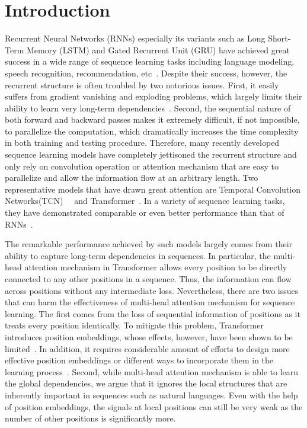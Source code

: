 \documentclass{article} \usepackage{iclr2019_conference,times}
\begin{document}
\section{Introduction}
Recurrent Neural Networks (RNNs) especially its variants such as Long Short-Term Memory (LSTM) and Gated Recurrent Unit (GRU) have achieved great success in a wide range of sequence learning tasks including language modeling, speech recognition, recommendation, etc~\citep{mikolov2010recurrent,sundermeyer2012lstm,graves2014towards,hinton2012deep,hidasi2015session}. Despite their success, however, the recurrent structure is often troubled by two notorious issues.  First, it easily suffers from gradient vanishing and exploding problems, which largely limits their ability to learn very long-term dependencies~\citep{pascanu2013difficulty}. Second, the sequential nature of both forward and backward passes makes it extremely difficult, if not impossible, to parallelize the computation, which dramatically increases the time complexity in both training and testing procedure. Therefore, many recently developed sequence learning models have completely jettisoned the recurrent structure and only rely on convolution operation or attention mechanism that are easy to parallelize and allow the information flow at an arbitrary length. Two representative models that have drawn great attention are Temporal Convolution Networks(TCN)~~\citep{bai2018empirical} and Transformer~\citep{vaswani2017attention}. In a variety of sequence learning tasks, they have demonstrated comparable or even better performance than that of RNNs~\citep{gehring2017convolutional,bai2018empirical,devlin2018bert}.
 

The remarkable performance achieved by such models largely comes from their ability to capture long-term dependencies in sequences. In particular, the multi-head attention mechanism in Transformer allows every position to be directly connected to any other positions in a sequence. Thus, the information can flow across positions without any intermediate loss. Nevertheless, there are two issues that can harm the effectiveness of multi-head attention mechanism for sequence learning. The first comes from the loss of sequential information of positions as it treats every position identically. To mitigate this problem, Transformer introduces position embeddings, whose effects, however, have been shown to be limited~\citep{dehghani2018universal,al2018character}. In addition, it requires considerable amount of efforts to design more effective position embeddings or different ways to incorporate them in the learning process~\citep{dai2019transformer}. Second, while multi-head attention mechanism is able to learn the global dependencies, we argue that it ignores the local structures that are inherently important in sequences such as natural languages. Even with the help of position embeddings, the signals at local positions can still be very weak as the number of other positions is significantly more. 
\end{document}
